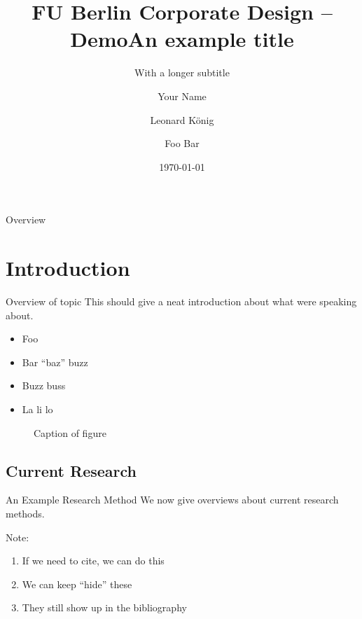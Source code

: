 \documentclass[aspectratio=169,hyperref={pdfusetitle,pdfencoding=auto}]{beamer}
\title[Demo]{FU Berlin Corporate Design – Demo}
\author[Initials]{Your Name}
\date{\today}
\title{An example title}
\subtitle{With a longer subtitle}
\institute{Institute for Silly Walks}
\author{Leonard König\and Foo Bar}
\begin{document}

\begin{frame}
  \titlepage
\end{frame}

\begin{frame}{Overview}
  \tableofcontents
\end{frame}


\section{Introduction}

\begin{frame}{Overview of topic}
This should give a neat introduction about what were speaking about.
\begin{itemize}
  \item Foo
  \item Bar \enquote{baz} buzz
  \item Buzz buss
  \item La li lo
\end{itemize}

\begin{figure}
\centering
{}
\caption{Caption of figure}
\end{figure}
\end{frame}


\subsection{Current Research}

\begin{frame}{An Example Research Method}
We now give overviews about current research methods.

\vfill
Note:
\begin{enumerate}
  \item If we need to cite, we can do this~\cite{Author/2025}
  \item We can keep \enquote{hide} these\nocite{Author/2025}
  \item They still show up in the bibliography
\end{enumerate}
\vfill
\end{frame}
\end{document}

